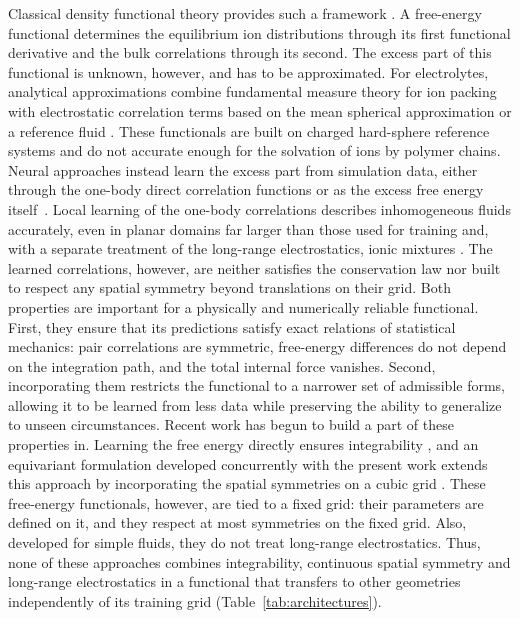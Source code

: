 Classical density functional theory provides such a framework \cite{evans1979nature,hansen2013theory}. A free-energy functional determines the equilibrium ion distributions through its first functional derivative and the bulk correlations through its second. The excess part of this functional is unknown, however, and has to be approximated. For electrolytes, analytical approximations combine fundamental measure theory for ion packing \cite{rosenfeld1989free,roth2010fundamental} with electrostatic correlation terms based on the mean spherical approximation or a reference fluid \cite{rosenfeld1993free,gillespie2002coupling}. These functionals are built on charged hard-sphere reference systems and do not accurate enough for the solvation of ions by polymer chains.
\layoutbreak
Neural approaches instead learn the excess part from simulation data, either through the one-body direct correlation functions or as the excess free energy itself~\cite{sammuller2023neural,bui2025learning,dijkman2025learning}. Local learning of the one-body correlations describes inhomogeneous fluids accurately, even in planar domains far larger than those used for training \cite{sammuller2023neural} and, with a separate treatment of the long-range electrostatics, ionic mixtures \cite{bui2025learning}. The learned correlations, however, are neither satisfies the conservation law nor built to respect any spatial symmetry beyond translations on their grid. 
Both properties are important for a physically and numerically reliable functional. First, they ensure that its predictions satisfy exact relations of statistical mechanics: pair correlations are symmetric, free-energy differences do not depend on the integration path, and the total internal force vanishes. Second, incorporating them restricts the functional to a narrower set of admissible forms, allowing it to be learned from less data \cite{batzner20223} while preserving the ability to generalize to unseen circumstances.
Recent work has begun to build a part of these properties in. Learning the free energy directly ensures integrability \cite{dijkman2025learning}, and an equivariant formulation developed concurrently with the present work extends this approach by incorporating the spatial symmetries on a cubic grid \cite{cheng2026equivariant}.
These free-energy functionals, however, are tied to a fixed grid: their parameters are defined on it, and they respect at most symmetries on the fixed grid. Also, developed for simple fluids, they do not treat long-range electrostatics. Thus, none of these approaches combines integrability, continuous spatial symmetry and long-range electrostatics in a functional that transfers to other geometries independently of its training grid (Table~\ref{tab:architectures}).




